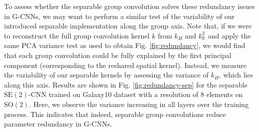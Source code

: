 \documentclass[nohyperref]{article}
\theoremstyle{plain}
\theoremstyle{definition}
\theoremstyle{remark}
\begin{document}
To assess whether the separable group convolution solves these redundancy issues in G-CNNs, we may want to perform a similar test of the variability of our introduced separable implementation along the group axis. Note that, if we were to reconstruct the full group convolution kernel $k$ from $k_H$ and $k_\mathbb{R}^2$ and apply the same PCA variance test as used to obtain Fig. \ref{fig:redundancy}, we would find that each group convolution could be fully explained by the first principal component (corresponding to the reshared spatial kernel). Instead, we measure the variability of our separable kernels by assessing the variance of $k_H$, which lies along this axis. Results are shown in Fig. \ref{fig:redundancy-sep} for the separable $\mathrm{SE(2)}$-CNN trained on Galaxy10 dataset with a resolution of 8 elements on $\mathrm{SO(2)}$. Here, we observe the variance increasing in all layers over the training process. This indicates that indeed, separable group convolutions reduce parameter redundancy in G-CNNs.
\end{document}

